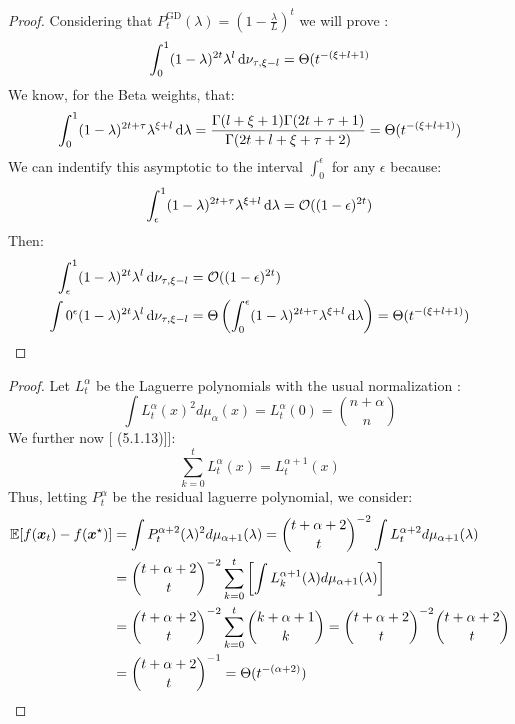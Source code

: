 \documentclass{article}
\begin{document}
\gdrates*
\begin{proof}
Considering that $P_t^\text{GD}(\lambda)=(1-\frac{\lambda}{L})^t$ we will prove :
\begin{equation}
    \int_0^1(1-\lambda)^{2t}\lambda^l\mathop{}\!\mathrm{d}\nu_{\tau,\xi-l}=\Theta(t^{-(\xi+l+1)}
\end{equation}
We know, for the Beta weights, that:
\begin{equation}
    \int_0^1(1-\lambda)^{2t+\tau}\lambda^{\xi+l}\mathop{}\!\mathrm{d}\lambda=\frac{\Gamma(l+\xi+1)\Gamma(2t+\tau+1)}{\Gamma(2t+l+\xi+\tau+2)}=\Theta(t^{-(\xi+l+1)})
\end{equation}
We can indentify this asymptotic to the interval $\int_0^\epsilon$ for any $\epsilon$ because:
\begin{equation}
    \int_\epsilon^1(1-\lambda)^{2t+\tau}\lambda^{\xi+l}\mathop{}\!\mathrm{d}\lambda=\mathcal{O}((1-\epsilon)^{2t})
\end{equation}
Then:
\begin{align}
    \int_\epsilon^1(1-\lambda)^{2t}\lambda^l\mathop{}\!\mathrm{d}\nu_{\tau,\xi-l}&=\mathcal{O}((1-\epsilon)^{2t}) \\
    \int0^\epsilon(1-\lambda)^{2t}\lambda^l\mathop{}\!\mathrm{d}\nu_{\tau,\xi-l}&=\Theta\left(\int_0^\epsilon(1-\lambda)^{2t+\tau}\lambda^{\xi+l}\mathop{}\!\mathrm{d}\lambda\right)=\Theta(t^{-(\xi+l+1)})
\end{align}

\end{proof}
\laguerrerates*
\begin{proof}
Let $L_t^\alpha$ be the Laguerre polynomials with the usual normalization \cite{szego1975orthogonal}:
\begin{equation}
    \int L_t^\alpha(x)^2d\mu_\alpha(x)=L_t^\alpha(0)=\binom{n+\alpha}{n} 
\end{equation}
We further now [\cite{szego1975orthogonal} (5.1.13)]]:
\begin{equation}
    \sum_{k=0}^tL_t^\alpha(x)=L_t^{\alpha+1}(x)
\end{equation}
Thus, letting $P_t^\alpha$ be the residual laguerre polynomial, we consider:
\begin{equation}
\begin{split}
    {\mathbb{E}}[f({\boldsymbol x}_t)-f({\boldsymbol x}^\star)]&=\int P_t^{\alpha+2}(\lambda)^2d\mu_{\alpha+1}(\lambda)=\binom{t+\alpha+2}{t}^{-2}\int L_t^{\alpha+2}d\mu_{\alpha+1}(\lambda)\\
    &=\binom{t+\alpha+2}{t}^{-2}\sum_{k=0}^{t}\left[\int L_k^{\alpha+1}(\lambda)d\mu_{\alpha+1}(\lambda)\right]\\
    &=\binom{t+\alpha+2}{t}^{-2}\sum_{k=0}^t\binom{k+\alpha+1}{k}=\binom{t+\alpha+2}{t}^{-2}\binom{t+\alpha+2}{t}\\
    &=\binom{t+\alpha+2}{t}^{-1}=\Theta( t^{-(\alpha+2)})
\end{split}
\end{equation}
\end{proof}
\end{document}
